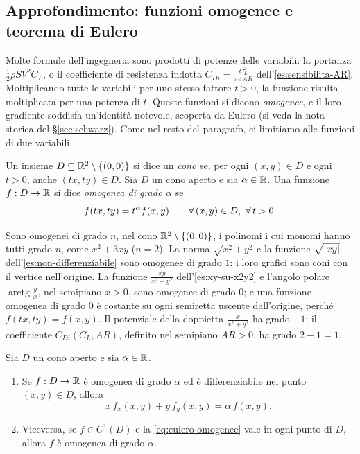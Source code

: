 \subsection{Approfondimento: funzioni omogenee e teorema di Eulero}
\label{subsec:funzioni-omogenee}

Molte formule dell'ingegneria sono prodotti di potenze delle variabili: la portanza
$\frac12\rho SV^{2}C_{L}$, o il coefficiente di resistenza indotta
$C_{Di}=\frac{C_{L}^{2}}{\pi e\,AR}$ dell'\cref{es:sensibilita-AR}. Moltiplicando tutte le
variabili per uno stesso fattore $t>0$, la funzione risulta moltiplicata per una potenza
di $t$. Queste funzioni si dicono \emph{omogenee}, e il loro gradiente soddisfa
un'identità notevole, scoperta da Eulero (si veda la nota storica del \S\ref{sec:schwarz}).
Come nel resto del paragrafo, ci limitiamo alle funzioni di due variabili.

\begin{definizione}\label{def:funzione-omogenea}
Un insieme $D\subseteq\mathbb{R}^{2}\setminus\{(0,0)\}$ si dice un \emph{cono} se, per ogni
$(x,y)\in D$ e ogni $t>0$, anche $(tx,ty)\in D$. Sia $D$ un cono aperto e
sia $\alpha\in\mathbb{R}$. Una funzione $f:D\to\mathbb{R}$ si dice \emph{omogenea di grado $\alpha$} se
\begin{equation}\label{eq:omogenea}
  f(tx,ty)=t^{\alpha}f(x,y) \qquad\forall\,(x,y)\in D,\ \forall\, t>0 .
\end{equation}
\end{definizione}

Sono omogenei di grado $n$, nel cono $\mathbb{R}^{2}\setminus\{(0,0)\}$, i polinomi i cui monomi
hanno tutti grado $n$, come $x^{2}+3xy$ ($n=2$). La norma $\sqrt{x^{2}+y^{2}}$ e la funzione
$\sqrt{\lvert xy\rvert}$ dell'\cref{es:non-differenziabile} sono omogenee di grado $1$: i loro
grafici sono coni con il vertice nell'origine. La funzione $\frac{xy}{x^{2}+y^{2}}$
dell'\cref{es:xy-su-x2y2} e l'angolo polare $\operatorname{arctg}\frac yx$, nel semipiano
$x>0$, sono omogenee di grado $0$; e una funzione omogenea di grado $0$ è costante su ogni
semiretta uscente dall'origine, perché $f(tx,ty)=f(x,y)$. Il potenziale della doppietta
$\frac{x}{x^{2}+y^{2}}$ ha grado $-1$; il coefficiente $C_{Di}(C_{L},AR)$, definito nel
semipiano $AR>0$, ha grado $2-1=1$.

\begin{teorema}\label{teo:eulero-omogenee}
Sia $D$ un cono aperto e sia $\alpha\in\mathbb{R}$.
\begin{enumerate}[label=\textup{(\roman*)}]
  \item Se $f:D\to\mathbb{R}$ è omogenea di grado $\alpha$ ed è differenziabile nel punto
  $(x,y)\in D$, allora
  \begin{equation}\label{eq:eulero-omogenee}
    x\,f_{x}(x,y)+y\,f_{y}(x,y)=\alpha\,f(x,y) .
  \end{equation}
  \item Viceversa, se $f\in C^{1}(D)$ e la \eqref{eq:eulero-omogenee} vale in ogni punto di
  $D$, allora $f$ è omogenea di grado $\alpha$.
\end{enumerate}
\end{teorema}

